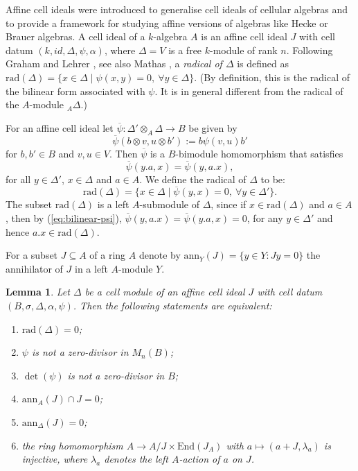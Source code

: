 \documentclass[oneside, a4paper, 11pt]{amsart}
\newtheorem{lemma}[theorem]{Lemma}
\newcommand{\ann}{\mathrm{ann}}
\newcommand{\rad}{\mathrm{rad}}
\newcommand{\End}{\mathrm{End}}
\begin{document}
Affine cell ideals were introduced to generalise cell ideals of cellular algebras and to provide a framework for studying affine versions of algebras like Hecke or Brauer algebras. A cell ideal of a $k$-algebra $A$ is an affine cell ideal $J$ with cell datum $(k,id, \Delta, \psi, \alpha)$, where $\Delta=V$ is a free $k$-module of rank $n$.  Following Graham and Lehrer \cite{GrahamLehrer}, see also Mathas \cite{Mathas}, a \emph{radical of $\Delta$} is defined as $\rad(\Delta)=\{ x\in \Delta \mid \psi(x,y)=0, \: \forall y\in \Delta\}$. (By definition, this is the
radical of the bilinear form associated with $\psi$. It is in general different
from the radical of the $A$-module ${}_A\Delta$.)

For an affine cell ideal let $\overline{\psi}:\Delta' \otimes_A \Delta \to B$
be given by 
\begin{equation}
    \overline{\psi}(b\otimes v, u\otimes b') := b\psi(v,u)b'
\end{equation}
for $b,b'\in B$ and $v,u\in V$. Then $\overline{\psi}$ is a $B$-bimodule homomorphism that satisfies 
\begin{equation}\label{eq:bilinear-psi}
    \overline{\psi}(y.a, x) = \overline{\psi}(y, a.x),
\end{equation}
for all $y\in \Delta'$, $x\in \Delta$ and $a\in A$.
We define the radical of $\Delta$ to be:
\begin{equation}\label{def:rad}
    \rad(\Delta)=\{ x\in \Delta \mid \overline{\psi}(y, x)=0, \: \forall y\in \Delta'\}.
\end{equation}
The subset $\rad(\Delta)$ is a left $A$-submodule of $\Delta$, since if $x\in \rad(\Delta)$ and $a\in A$, then by (\ref{eq:bilinear-psi}),  
$ \overline{\psi}(y, a.x)=\overline{\psi}(y.a, x)=0$, for any $y\in \Delta'$ and hence $a.x \in \rad(\Delta)$.

For a subset $J\subseteq A$ of a ring $A$ denote by $\ann_Y(J) = \{ y\in Y: Jy=0\}$ the annihilator of $J$ in a left $A$-module $Y$.

\begin{lemma}\label{lemma1}
    Let $\Delta$ be a cell module of an affine cell ideal $J$ with cell datum $(B,\sigma, \Delta, \alpha, \psi)$. Then the following statements are equivalent:
    \begin{enumerate}
        \item[(a)] $\rad(\Delta)=0$;
        \item[(b)] $\psi$ is not a zero-divisor in $M_n(B)$;
        \item[(c)] $\det(\psi)$ is not a zero-divisor in $B$;
        \item[(d)] $\ann_A(J) \cap J = 0$;
        \item[(e)] $\ann_{\Delta}(J)=0$;
        \item[(f)] the ring homomorphism $A\to A/J \times \End(J_A)$ with $a\mapsto (a+J, \lambda_a)$ is injective, where  $\lambda_a$ denotes the left $A$-action of $a$ on $J$.
    \end{enumerate}
\end{lemma}
\end{document}
